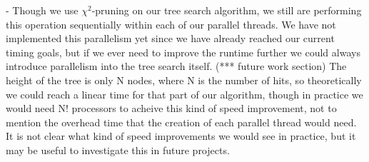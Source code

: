 - Though we use $\chi^2$-pruning on our tree search algorithm, we still are performing this operation sequentially within each of our parallel threads. We have not implemented this parallelism yet since we have already reached our current timing goals, but if we ever need to improve the runtime further we could always introduce parallelism into the tree search itself. (*** future work section) The height of the tree is only N nodes, where N is the number of hits, so theoretically we could reach a linear time for that part of our algorithm, though in practice we would need N! processors to acheive this kind of speed improvement, not to mention the overhead time that the creation of each parallel thread would need. It is not clear what kind of speed improvements we would see in practice, but it may be useful to investigate this in future projects.